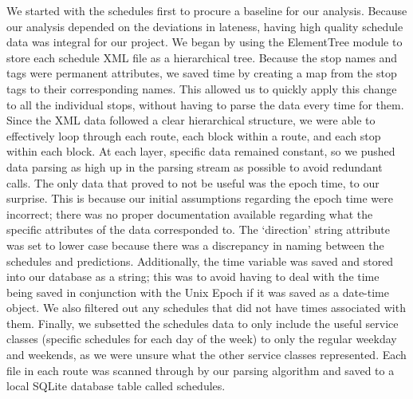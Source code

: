 \documentclass[]{article}
\begin{document}
	We started with the schedules first to procure a baseline for our analysis. Because our analysis depended on the deviations in lateness, having high quality schedule data was integral for our project. We began by using the ElementTree module to store each schedule XML file as a hierarchical tree. Because the stop names and tags were permanent attributes, we saved time by creating a map from the stop tags to their corresponding names. This allowed us to quickly apply this change to all the individual stops, without having to parse the data every time for them. Since the XML data followed a clear hierarchical structure, we were able to effectively loop through each route, each block within a route, and each stop within each block. At each layer, specific data remained constant, so we pushed data parsing as high up in the parsing stream as possible to avoid redundant calls. The only data that proved to not be useful was the epoch time, to our surprise. This is because our initial assumptions regarding the epoch time were incorrect; there was no proper documentation available regarding what the specific attributes of the data corresponded to. The ‘direction’ string attribute was set to lower case because there was a discrepancy in naming between the schedules and predictions. Additionally, the time variable was saved and stored into our database as a string; this was to avoid having to deal with the time being saved in conjunction with the Unix Epoch if it was saved as a date-time object. We also filtered out any schedules that did not have times associated with them. Finally, we subsetted the schedules data to only include the useful service classes (specific schedules for each day of the week) to only the regular weekday and weekends, as we were unsure what the other service classes represented. Each file in each route was scanned through by our parsing algorithm and saved to a local SQLite database table called schedules. 
\end{document}

